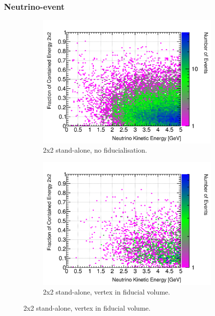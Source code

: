\documentclass[10pt,a4paper,openany]{article}
\begin{document}
\subsubsection{Neutrino-event}
\begin{figure}[htbp]
	\centering
	\begin{subfigure}[b]{0.49\textwidth}
		\centering
		\includegraphics[width=1.0\textwidth]{E_contained_frac_2x2.png}
		\caption{2x2 stand-alone, no fiducialisation.}
		\label{}
	\end{subfigure}	
	\hfill
	\begin{subfigure}[b]{0.49\textwidth}
		\centering
    \includegraphics[width=1.0\textwidth]{E_contained_frac_2x2_fiducial.png}
		\caption{2x2 stand-alone, vertex in fiducial volume.}
		\label{}

\end{subfigure}
\end{figure}
\end{document}
